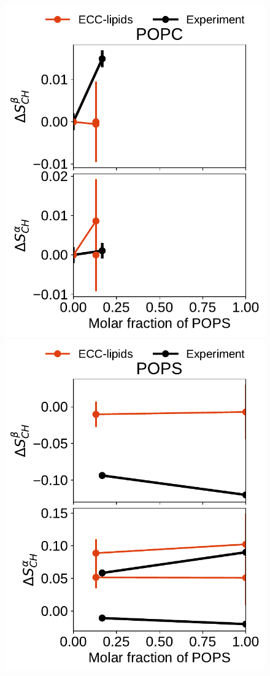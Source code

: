 \documentclass[journal=jpcbfk,manuscript=article]{achemso}
\newlength{\figwidth}
\begin{document}
\begin{figure}[htb!] 
  \centering 
  \includegraphics[width=\figwidth]{../Fig/order_parameters_changes_A-B_PC-PS_mix_POPC_nacl.pdf} 
  \includegraphics[width=\figwidth]{../Fig/order_parameters_changes_A-B_PC-PS_mix_POPS_nacl.pdf} 

\end{figure}
\end{document}
